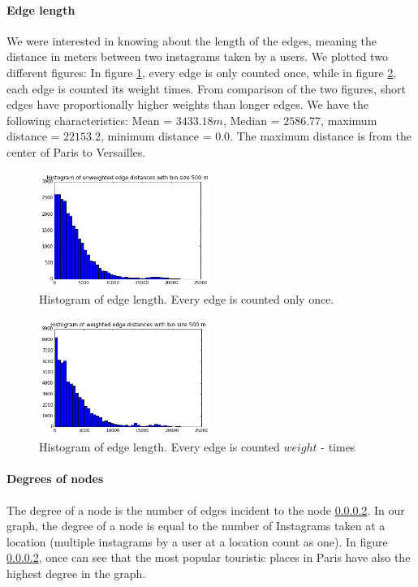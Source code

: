 \paragraph{Edge length}
We were interested in knowing about the length of the edges, meaning the distance in meters between two instagrams taken by a users. We plotted two different figures: In figure \ref{fig:unweighted_edge_distance}, every edge is only counted once, while in figure \ref{fig:weighted_edge_distance}, each edge is counted its weight times. From comparison of the two figures, short edges have proportionally higher weights than longer edges. We have the following characteristics: Mean = $3433.18m$, Median = $2586.77$, maximum distance = $22153.2$, minimum distance = $0.0$. The maximum distance is from the center of Paris to Versailles.

\begin{figure}[h!]
  \centering
    \includegraphics[width=0.5\textwidth]{images/unweighted_edge_distance}
  \caption{Histogram of edge length. Every edge is counted only once.}
  \label{fig:unweighted_edge_distance}
\end{figure}

\begin{figure}[h!]
  \centering
    \includegraphics[width=0.5\textwidth]{images/weighted_edge_distance}
  \caption{Histogram of edge length. Every edge is counted $weight$ - times}
  \label{fig:weighted_edge_distance}
\end{figure}

\paragraph{Degrees of nodes}
The degree of a node is the number of edges incident to the node \ref{}. In our graph, the degree of a node is equal to the number of Instagrams taken at a location (multiple instagrams by a user at a location count as one). In figure \ref{}, once can see that the most popular touristic places in Paris have also the highest degree in the graph.

